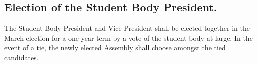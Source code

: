 \subsection{Election of the Student Body President.}
The Student Body President and Vice President shall be elected together in the March election for a one year term by a vote of the student body at large.    In the event of a tie, the newly elected Assembly shall choose amongst the tied candidates.